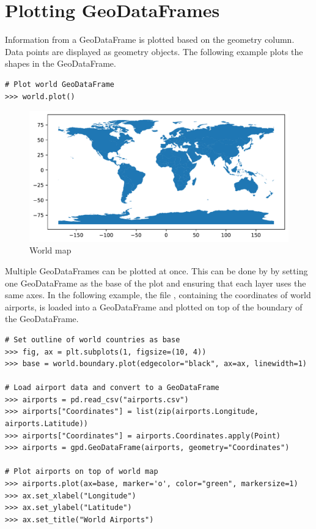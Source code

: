 \section*{Plotting GeoDataFrames} %

Information from a GeoDataFrame is plotted based on the geometry column.
Data points are displayed as geometry objects.
The following example plots the shapes in the  GeoDataFrame.

\begin{lstlisting}
# Plot world GeoDataFrame
>>> world.plot()
\end{lstlisting}

\begin{figure}[H]
\begin{center}
\includegraphics[scale=.7]{figures/worldmap.pdf}
\end{center}
\label{world-map}
\caption{World map}
\end{figure}

Multiple GeoDataFrames can be plotted at once.
This can be done by by setting one GeoDataFrame as the base of the plot and ensuring that each layer uses the same axes.
In the following example, the file , containing the coordinates of world airports, is loaded into a GeoDataFrame and plotted on top of the boundary of the  GeoDataFrame.

\begin{lstlisting}
# Set outline of world countries as base
>>> fig, ax = plt.subplots(1, figsize=(10, 4))
>>> base = world.boundary.plot(edgecolor="black", ax=ax, linewidth=1)

# Load airport data and convert to a GeoDataFrame
>>> airports = pd.read_csv("airports.csv")
>>> airports["Coordinates"] = list(zip(airports.Longitude, airports.Latitude))
>>> airports["Coordinates"] = airports.Coordinates.apply(Point)
>>> airports = gpd.GeoDataFrame(airports, geometry="Coordinates")

# Plot airports on top of world map
>>> airports.plot(ax=base, marker='o', color="green", markersize=1)
>>> ax.set_xlabel("Longitude")
>>> ax.set_ylabel("Latitude")
>>> ax.set_title("World Airports")
\end{lstlisting}

